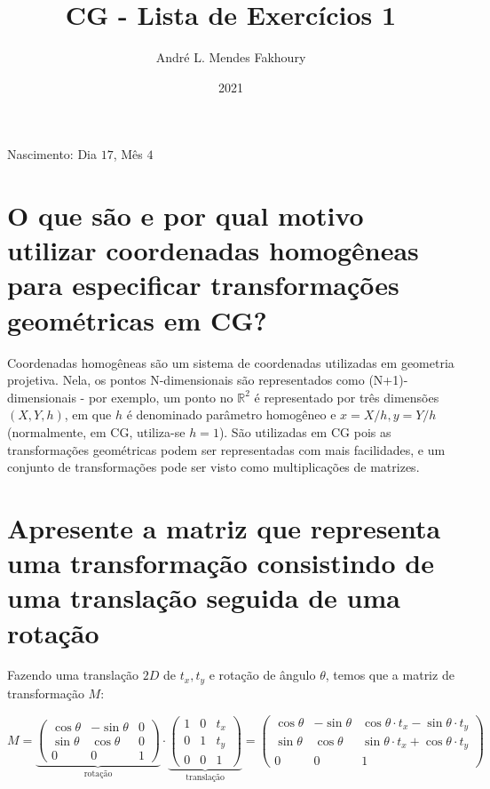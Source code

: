 \documentclass{article}
\title{CG - Lista de Exercícios 1}
\author{André L. Mendes Fakhoury}
\date{2021}
\begin{document}
\maketitle

Nascimento: Dia $17$, Mês $4$


\section{O que são e por qual motivo utilizar coordenadas homogêneas para especificar transformações geométricas em CG?}

Coordenadas homogêneas são um sistema de coordenadas utilizadas em geometria projetiva. Nela, os pontos N-dimensionais são representados como (N+1)-dimensionais - por exemplo, um ponto no $\mathbb{R}^2$ é representado por três dimensões $(X, Y, h)$, em que $h$ é denominado parâmetro homogêneo e $x = X/h, y=Y/h$ (normalmente, em CG, utiliza-se $h = 1$). São utilizadas em CG pois as transformações geométricas podem ser representadas com mais facilidades, e um conjunto de transformações pode ser visto como multiplicações de matrizes.

\section{Apresente a matriz que representa uma transformação consistindo de uma translação seguida de uma rotação}

Fazendo uma translação $2D$ de $t_x, t_y$ e rotação de ângulo $\theta$, temos que a matriz de transformação $M$:

$$M = \underbrace{
	\begin{pmatrix}
		\cos\theta & -\sin\theta & 0\\
		\sin\theta & \cos\theta & 0\\
		0 & 0 & 1
	\end{pmatrix}
}_\text{rotação}
\cdot
\underbrace{\begin{pmatrix}
		1 & 0 & t_x\\
		0 & 1 & t_y\\
		0 & 0 & 1
\end{pmatrix}}_\text{translação}
=
\begin{pmatrix}
	\cos\theta & -\sin\theta & \cos\theta \cdot t_x - \sin\theta \cdot t_y\\
	\sin\theta & \cos\theta & \sin\theta \cdot t_x + \cos\theta \cdot t_y\\
	0 & 0 & 1
\end{pmatrix}
$$
\end{document}
